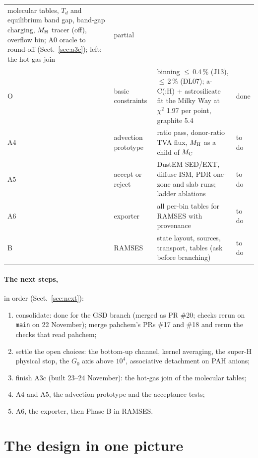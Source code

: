 \documentclass[11pt,a4paper]{article}
\newcommand{\MH}{M_{\rm H}}
\newcommand{\MC}{M_{\rm C}}
\newcommand{\ok}{\textcolor{green!45!black}{done}}
\newcommand{\wip}{\textcolor{orange!80!black}{partial}}
\newcommand{\todo}{\textcolor{red!70!black}{to do}}
\begin{document}
\begin{table}[H]
\begin{tabularx}{\textwidth}{@{}l l L l@{}}
      molecular tables, $T_d$ and equilibrium band gap, band-gap charging, $\MH$ tracer (off), overflow bin; A0
      oracle to round-off (Sect.~\ref{sec:a3c}); left: the hot-gas join & \wip \\
O & basic constraints & binning $\le$\,0.4\,\% (J13), $\le$\,2\,\% (DL07); a-C(:H) + astrosilicate fit the Milky Way at
      $\chi^2$ 1.97 per point, graphite 5.4 & \ok \\
A4 & advection prototype & ratio pass, donor-ratio TVA flux, $\MH$ as a child of $\MC$ & \todo \\
A5 & accept or reject & DustEM SED/EXT, diffuse ISM, PDR one-zone and slab runs; ladder ablations & \todo \\
A6 & exporter & all per-bin tables for RAMSES with provenance & \todo \\
B & RAMSES & state layout, sources, transport, tables (ask before branching) & \todo \\
\bottomrule
\end{tabularx}
\end{table}

\paragraph{The next steps,} in order (Sect.~\ref{sec:next}):
\begin{enumerate}
\item consolidate: done for the GSD branch (merged as PR \#20; checks rerun on \texttt{main} on 22 November); merge
  pahchem's PRs \#17 and \#18 and rerun the checks that read pahchem;
\item settle the open choices: the bottom-up channel, kernel averaging, the super-H physical stop, the $G_0$ axis
  above $10^4$, associative detachment on PAH anions;
\item finish A3c (built 23--24 November): the hot-gas join of the molecular tables;
\item A4 and A5, the advection prototype and the acceptance tests;
\item A6, the exporter, then Phase B in RAMSES.
\end{enumerate}

\section{The design in one picture}
\end{document}
